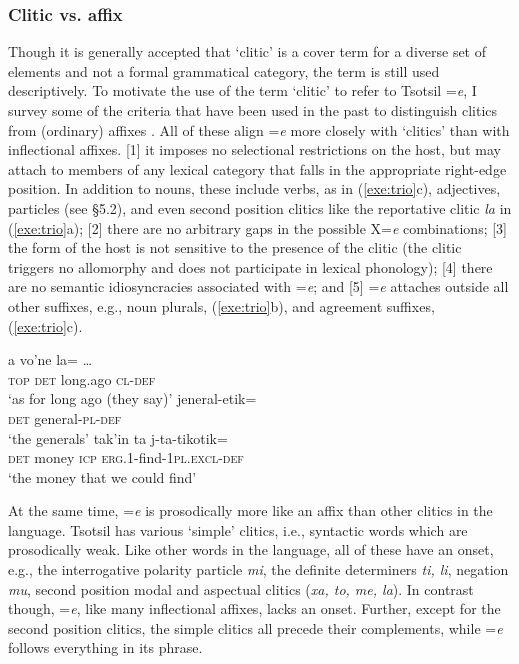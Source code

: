 \documentclass[output=paper,
modfonts
]{LSP/langsci}
\begin{document}
\subsubsection{Clitic vs. affix}
Though it is generally accepted that `clitic' is a cover term for a diverse set of elements and not a formal grammatical category, 
the term is still used descriptively. To motivate the use of the term `clitic' to refer to Tsotsil =\emph{e}, I 
survey some of the criteria that have been used in the past to  distinguish clitics from (ordinary) affixes \citep{zwickypullum1983}.  
All of these align =\emph{e} more closely with `clitics' than with inflectional affixes. 
[1]  it imposes no selectional restrictions on the host, but may attach to members of any lexical category that falls in the appropriate right-edge position. In addition to nouns, these include verbs, as in (\ref{exe:trio}c), adjectives, particles (see \S5.2), and even second position clitics like the reportative clitic \emph{la} in (\ref{exe:trio}a); [2] there are no arbitrary gaps in the possible X=\emph{e} combinations; [3] the form of the host is not sensitive to the presence of the clitic (the clitic triggers no allomorphy and does not participate in lexical phonology); [4] there are no semantic idiosyncracies associated with =\emph{e}; and [5] =\emph{e} attaches outside all other suffixes, e.g., noun plurals,  (\ref{exe:trio}b), and agreement suffixes, (\ref{exe:trio}c).
\begin{exe}
\ex\label{exe:trio}
\begin{xlist}
\bridgeoverex
{}
\gll a  vo'ne la= \dots \\
 \textsc{top} \textsc{det} long.ago \textsc{cl-def} \\
 \glt  `as for long ago (they say)'
\bridgeoverex
{}
\gll {} jeneral-etik= \\
\textsc{det} general-\textsc{pl-def} \\
 \glt  `the generals'
\bridgeoverex
{}
\gll  {} tak'in ta j-ta-tikotik= \\
 \textsc{det} money \textsc{icp} \textsc{erg.1}-find-\textsc{1pl.excl-def} \\
 \glt `the  money that we could find'
\end{xlist}
\end{exe}

At the same time, =\emph{e} is prosodically more like an affix than other clitics in the language. Tsotsil has various
`simple' clitics, i.e., syntactic words which are prosodically weak. Like other words in the language, all of these have an onset,
e.g., the interrogative polarity particle \emph{mi}, the definite determiners \emph{ti, li}, negation \emph{mu}, second position modal
and aspectual clitics (\emph{xa, to, me, la}).  In contrast though, =\emph{e}, like many inflectional affixes,  lacks an onset. Further, except for the second position clitics, the simple clitics all precede their complements, while =\emph{e} follows everything in its phrase.
\end{document}
